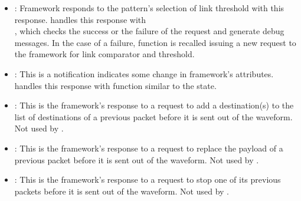 \begin{itemize}
\begin{itemize}
	\item {}: 
	Framework responds to the pattern's selection of link threshold with this response. 
	 handles this response with \\ , which checks the success or the failure of the request and generate debug messages. 
	In the case of a failure,  function is recalled issuing a new request to the framework for link comparator and threshold. 
	
	\item {}: 
	This is a notification indicates some change in framework's attributes.  handles this response with  function similar to the  state.
	
	\item {}: 
	This is the framework's response to a request to add a destination(s) to the list of destinations of a previous packet before it is sent out of the waveform.   
	Not used by .
	
	\item {}: 
	This is the framework's response to a request to replace the payload of a previous packet before it is sent out of the waveform.   
	Not used by .
	
	\item {}: 
	This is the framework's response to a request to stop one of its previous packets before it is sent out of the waveform.  
	Not used by .
	
	
	\end{itemize}

\end{itemize}


